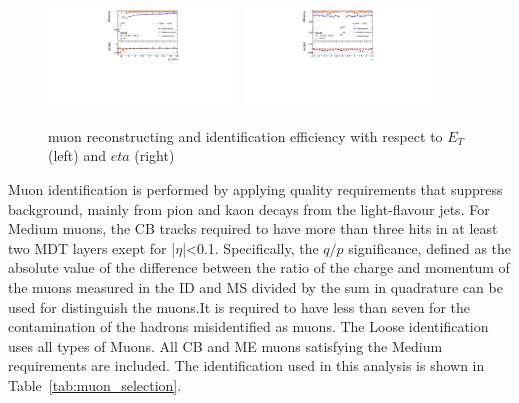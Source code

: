 \begin{figure}[tbp]
\begin{center}
 \includegraphics[width=0.45\textwidth,keepaspectratio]{figures/Reconstruction/recoMuonpT}
 \includegraphics[width=0.45\textwidth,keepaspectratio]{figures/Reconstruction/recoMuonEta}
\caption{
muon reconstructing and identification efficiency with respect to $E_T$ (left) and $eta$ (right) \cite{MUON-2018-03}
}
\label{fig:recoMuon}
\end{center}
\end{figure}
Muon identification is performed by applying quality requirements that suppress background, mainly from pion and kaon decays from the light-flavour jets. 
For Medium muons, the CB tracks required to have more than three hits in at least two MDT layers exept for |$\eta$|<0.1.
Specifically, the $q/p$ significance, defined as the absolute value of the difference between the ratio of the charge and momentum of the muons measured in the ID and MS divided by the sum in quadrature can be used for distinguish the muons.It is required to have less than seven for the contamination of the hadrons misidentified as muons.
The Loose identification uses all types of Muons. All CB and ME muons satisfying the Medium requirements are included. 
The identification used in this analysis is shown in Table~\ref{tab:muon_selection}.
